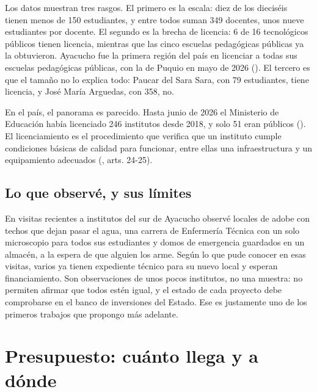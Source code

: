 \documentclass[
  jou,
  floatsintext,
  longtable,
  a4paper,
  nolmodern,
  notxfonts,
  notimes,
  12pt,
  colorlinks=true,linkcolor=blue,citecolor=blue,urlcolor=blue]{apa7}
\begin{document}
Los datos muestran tres rasgos. El primero es la escala: diez de los
dieciséis tienen menos de 150 estudiantes, y entre todos suman 349
docentes, unos nueve estudiantes por docente. El segundo es la brecha de
licencia: 6 de 16 tecnológicos públicos tienen licencia, mientras que
las cinco escuelas pedagógicas públicas ya la obtuvieron. Ayacucho fue
la primera región del país en licenciar a todas sus escuelas pedagógicas
públicas, con la de Puquio en mayo de 2026
(). El tercero es que el tamaño no lo explica todo:
Paucar del Sara Sara, con 79 estudiantes, tiene licencia, y José María
Arguedas, con 358, no.

En el país, el panorama es parecido. Hasta junio de 2026 el Ministerio
de Educación había licenciado 246 institutos desde 2018, y solo 51 eran
públicos
(). El licenciamiento es el procedimiento que
verifica que un instituto cumple condiciones básicas de calidad para
funcionar, entre ellas una infraestructura y un equipamiento adecuados
(, arts. 24-25).

\subsection{Lo que observé, y sus
límites}\label{lo-que-observuxe9-y-sus-luxedmites}

En visitas recientes a institutos del sur de Ayacucho observé locales de
adobe con techos que dejan pasar el agua, una carrera de Enfermería
Técnica con un solo microscopio para todos sus estudiantes y domos de
emergencia guardados en un almacén, a la espera de que alguien los arme.
Según lo que pude conocer en esas visitas, varios ya tienen expediente
técnico para su nuevo local y esperan financiamiento. Son observaciones
de unos pocos institutos, no una muestra: no permiten afirmar que todos
estén igual, y el estado de cada proyecto debe comprobarse en el banco
de inversiones del Estado. Ese es justamente uno de los primeros
trabajos que propongo más adelante.

\section{Presupuesto: cuánto llega y a
dónde}\label{presupuesto-cuuxe1nto-llega-y-a-duxf3nde}
\end{document}
